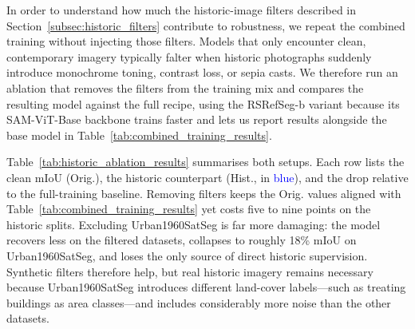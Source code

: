 \documentclass[journal]{IEEEtran}
\begin{document}
In order to understand how much the historic-image filters described in Section~\ref{subsec:historic_filters} contribute to robustness, we repeat the combined training without injecting those filters. Models that only encounter clean, contemporary imagery typically falter when historic photographs suddenly introduce monochrome toning, contrast loss, or sepia casts. We therefore run an ablation that removes the filters from the training mix and compares the resulting model against the full recipe, using the RSRefSeg-b variant because its SAM-ViT-Base backbone trains faster and lets us report results alongside the base model in Table~\ref{tab:combined_training_results}.

Table~\ref{tab:historic_ablation_results} summarises both setups. Each row lists the clean mIoU (Orig.), the historic counterpart (Hist., in \textcolor{blue}{blue}), and the drop relative to the full-training baseline. Removing filters keeps the Orig. values aligned with Table~\ref{tab:combined_training_results} yet costs five to nine points on the historic splits. Excluding Urban1960SatSeg is far more damaging: the model recovers less on the filtered datasets, collapses to roughly 18\% mIoU on Urban1960SatSeg, and loses the only source of direct historic supervision. Synthetic filters therefore help, but real historic imagery remains necessary because Urban1960SatSeg introduces different land-cover labels—such as treating buildings as area classes—and includes considerably more noise than the other datasets.
\end{document}
